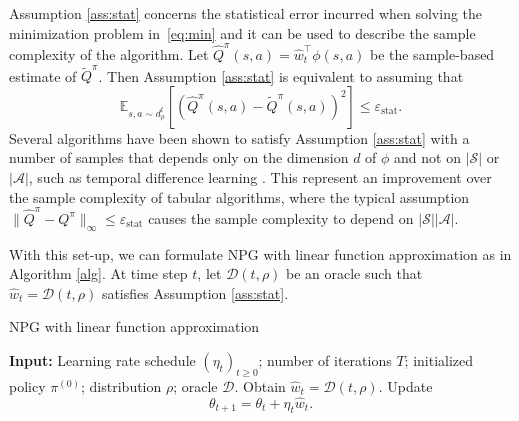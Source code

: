 \documentclass[a4paper,12pt]{article}
\numberwithin{theorem}{section}
\newcommand\E{\mathbb{E}}
\newcommand\A{\mathcal{A}}
\renewcommand\S{\mathcal{S}}
\newcommand\D{\mathcal{D}}
\newcommand\1{\mathbf{1}}
\begin{document}
Assumption \ref{ass:stat} concerns the statistical error incurred when solving the minimization problem in~\eqref{eq:min} and it can be used to describe the sample complexity of the algorithm. Let $\widehat{Q}^\pi(s,a) = \widehat{w}_t^\top \phi(s,a)$ be the sample-based estimate of $\widetilde{Q}^\pi$. Then Assumption \ref{ass:stat} is equivalent to assuming that 
\[\E_{s,a\sim d^t_\rho}\left[\left(\widehat{Q}^\pi(s,a)-\widetilde{Q}^\pi(s,a)\right)^2\right]\leq\varepsilon_\text{stat}.\]
Several algorithms have been shown to satisfy Assumption \ref{ass:stat} with a number of samples that depends only on the dimension $d$ of $\phi$ and not on $|\S|$ or $|\A|$, such as temporal difference learning \citep{bhandari2018finite}. This represent an improvement over the sample complexity of tabular algorithms, where the typical assumption $\lVert \widehat{Q}^\pi-Q^\pi \rVert_\infty\leq\varepsilon_\text{stat}$ \citep{RN266, RN269} causes the sample complexity to depend on $|\S||\A|$.

With this set-up, we can formulate NPG with linear function approximation as in Algorithm \ref{alg}. At time step $t$, let $\D(t,\rho)$ be an oracle such that $\widehat{w}_t = \D(t,\rho)$ satisfies Assumption \ref{ass:stat}.

\begin{algorithm}[h]
	\caption{NPG with linear function approximation}
	\label{alg}
	\begin{algorithmic}
		\STATE \textbf{Input:} Learning rate schedule $(\eta_t)_{t\geq 0}$; number of iterations $T$; initialized policy $\pi^{(0)}$; distribution $\rho$; oracle $\D$.
		\STATE Obtain $\widehat{w}_t = \D(t,\rho)$.
		\STATE Update \[\theta_{t+1}=\theta_t+\eta_t \widehat{w}_t.\]
		\ENDFOR
	\end{algorithmic}
\end{algorithm}
\end{document}
